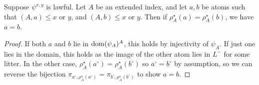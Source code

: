 \begin{lemma}
    \label{lem:atom_injective}
    Suppose \( \psi^{x,y} \) is lawful.
    Let \( A \) be an extended index, and let \( a, b \) be atoms such that \( (A, a) \leq x \) or \( y \), and \( (A, b) \leq x \) or \( y \).
    Then if \( \rho^\star_A(a) = \rho^\star_A(b) \), we have \( a = b \).
\end{lemma}
\begin{proof}
    If both \( a \) and \( b \) lie in \( \operatorname{dom} (\psi_A)^A \), this holds by injectivity of \( \psi_A \).
    If just one lies in the domain, this holds as the image of the other atom lies in \( L^- \) for some litter.
    In the other case, \( \rho^\star_A(a^\circ) = \rho^\star_A(b^\circ) \) so \( a^\circ = b^\circ \) by assumption, so we can reverse the bijection \( \pi_{a^\circ, \rho^\star_A(a^\circ)} = \pi_{b^\circ, \rho^\star_A(b^\circ)} \) to show \( a = b \).
\end{proof}

